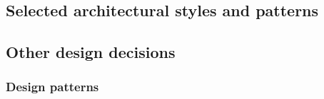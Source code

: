\subsection{Selected architectural styles and patterns}
\subsection{Other design decisions}
	\subsubsection{Design patterns}